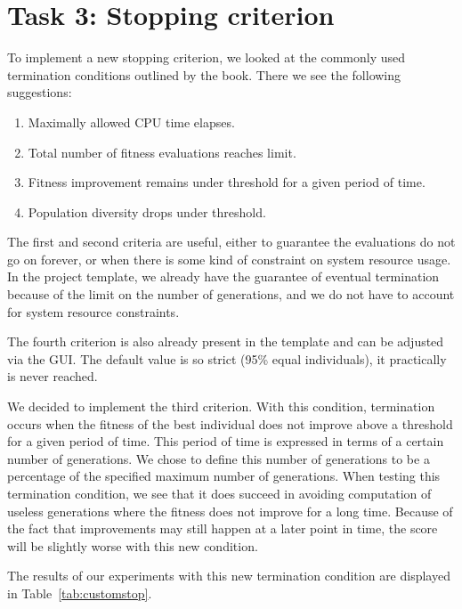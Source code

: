 \documentclass{report}
\begin{document}
\section{Task 3: Stopping criterion}
To implement a new stopping criterion, we looked at the commonly used termination conditions outlined by the book. There we see the following suggestions:
\begin{enumerate}
	\item Maximally allowed CPU time elapses.
	\item Total number of fitness evaluations reaches limit.
	\item Fitness improvement remains under threshold for a given period of time.
	\item Population diversity drops under threshold.
\end{enumerate}
The first and second criteria are useful, either to guarantee the evaluations do not go on forever, or when there is some kind of constraint on system resource usage. In the project template, we already have the guarantee of eventual termination because of the limit on the number of generations, and we do not have to account for system resource constraints.

The fourth criterion is also already present in the template and can be adjusted via the GUI. The default value is so strict (95\% equal individuals), it practically is never reached.

We decided to implement the third criterion. With this condition, termination occurs when the fitness of the best individual does not improve above a threshold for a given period of time. This period of time is expressed in terms of a certain number of generations. We chose to define this number of generations to be a percentage of the specified maximum number of generations. When testing this termination condition, we see that it does succeed in avoiding computation of useless generations where the fitness does not improve for a long time. Because of the fact that improvements may still happen at a later point in time, the score will be slightly worse with this new condition.
	
The results of our experiments with this new termination condition are displayed in Table~\ref{tab:customstop}.
\end{document}
